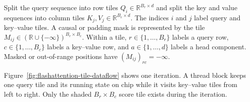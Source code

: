 \documentclass[11pt]{article}
\numberwithin{equation}{section}
\newcommand{\R}{\mathbb{R}}
\begin{document}
Split the query sequence into row tiles $Q_i\in\R^{B_r\times d}$ and split the key
and value sequences into column tiles
$K_j,V_j\in\R^{B_c\times d}$.  The indices $i$ and $j$ label query and key--value
tiles.  A causal or padding mask is represented by the tile
$M_{ij}\in(\R\cup\{-\infty\})^{B_r\times B_c}$.  Within a tile,
$r\in\{1,\ldots,B_r\}$ labels a query row, $c\in\{1,\ldots,B_c\}$ labels a
key--value row, and $a\in\{1,\ldots,d\}$ labels a head component.  Masked or
out-of-range positions have $(M_{ij})_{rc}=-\infty$.

Figure~\ref{fig:flashattention-tile-dataflow} shows one iteration.  A thread block
keeps one query tile and its running state on chip while it visits key--value tiles
from left to right.  Only the shaded $B_r\times B_c$ score tile exists during the
iteration.
\end{document}

